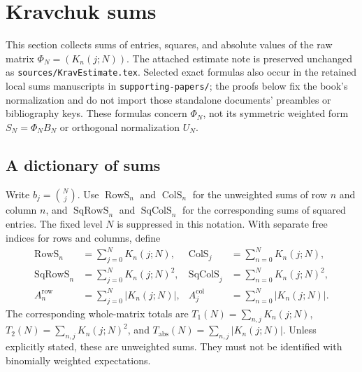 \section{Kravchuk sums}
\label{sec:kravchuk-sums}
This section collects sums of entries, squares, and absolute values of the raw matrix $\Phi_N=(K_n(j;N))$. The attached estimate note is preserved unchanged as \texttt{sources/KravEstimate.tex}. Selected exact formulas also occur in the retained local sums manuscripts in \texttt{supporting-papers/}; the proofs below fix the book's normalization and do not import those standalone documents' preambles or bibliography keys. These formulas concern $\Phi_N$, not its symmetric weighted form $S_N=\Phi_NB_N$ or orthogonal normalization $U_N$.

\subsection{A dictionary of sums}
Write $b_j=\binom Nj$. Use $\operatorname{RowS}_n$ and $\operatorname{ColS}_n$ for the unweighted sums of row $n$ and column $n$, and $\operatorname{SqRowS}_n$ and $\operatorname{SqColS}_n$ for the corresponding sums of squared entries. The fixed level $N$ is suppressed in this notation. With separate free indices for rows and columns, define
\begin{align*}
\operatorname{RowS}_n&=\sum_{j=0}^N K_n(j;N),& \operatorname{ColS}_j&=\sum_{n=0}^N K_n(j;N),\\
\operatorname{SqRowS}_n&=\sum_{j=0}^N K_n(j;N)^2,&\operatorname{SqColS}_j&=\sum_{n=0}^N K_n(j;N)^2,\\
A_n^{\mathrm{row}}&=\sum_{j=0}^N|K_n(j;N)|,&A_j^{\mathrm{col}}&=\sum_{n=0}^N|K_n(j;N)|.
\end{align*}
The corresponding whole-matrix totals are $T_1(N)=\sum_{n,j}K_n(j;N)$, $T_2(N)=\sum_{n,j}K_n(j;N)^2$, and $T_{\mathrm{abs}}(N)=\sum_{n,j}|K_n(j;N)|$. Unless explicitly stated, these are unweighted sums. They must not be identified with binomially weighted expectations.

